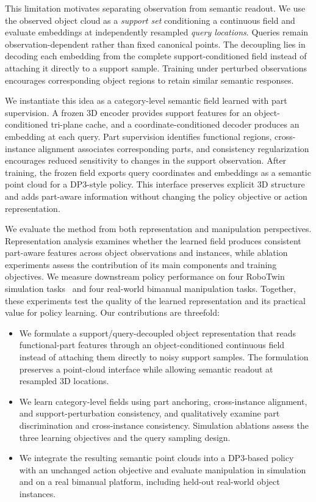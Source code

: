This limitation motivates separating observation from semantic readout. We use the observed object cloud as a \emph{support set} conditioning a continuous field and evaluate embeddings at independently resampled \emph{query locations}. Queries remain observation-dependent rather than fixed canonical points. The decoupling lies in decoding each embedding from the complete support-conditioned field instead of attaching it directly to a support sample. Training under perturbed observations encourages corresponding object regions to retain similar semantic responses.


We instantiate this idea as a category-level semantic field learned with part supervision. A frozen 3D encoder provides support features for an object-conditioned tri-plane cache, and a coordinate-conditioned decoder produces an embedding at each query. Part supervision identifies functional regions, cross-instance alignment associates corresponding parts, and consistency regularization encourages reduced sensitivity to changes in the support observation. After training, the frozen field exports query coordinates and embeddings as a semantic point cloud for a DP3-style policy. This interface preserves explicit 3D structure and adds part-aware information without changing the policy objective or action representation.


We evaluate the method from both representation and manipulation perspectives. Representation analysis examines whether the learned field produces consistent part-aware features across object observations and instances, while ablation experiments assess the contribution of its main components and training objectives. We measure downstream policy performance on four RoboTwin simulation tasks~\cite{chen2025robotwin} and four real-world bimanual manipulation tasks. Together, these experiments test the quality of the learned representation and its practical value for policy learning. Our contributions are threefold:
\begin{itemize}
    \item We formulate a support/query-decoupled object representation that reads functional-part features through an object-conditioned continuous field instead of attaching them directly to noisy support samples. The formulation preserves a point-cloud interface while allowing semantic readout at resampled 3D locations.
    \item We learn category-level fields using part anchoring, cross-instance alignment, and support-perturbation consistency, and qualitatively examine part discrimination and cross-instance consistency. Simulation ablations assess the three learning objectives and the query sampling design.
    \item We integrate the resulting semantic point clouds into a DP3-based policy with an unchanged action objective and evaluate manipulation in simulation and on a real bimanual platform, including held-out real-world object instances.
\end{itemize}
